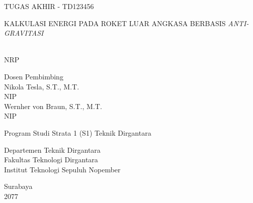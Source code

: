 \begin{large}
  TUGAS AKHIR - TD123456
\end{large}

\vspace{\fill}

\begin{spacing}{1.5}
  \begin{Large}
    KALKULASI ENERGI PADA ROKET LUAR
    ANGKASA BERBASIS \emph{ANTI-GRAVITASI}
  \end{Large}
\end{spacing}

\vspace{\fill}

\begin{large}
  \name{} \\
  \textmd{NRP \nrp{}}
\end{large}

\vspace{\fill}

\begin{large}
  \textmd{Dosen Pembimbing} \\
  Nikola Tesla, S.T., M.T. \\
  \textmd{NIP \advisornip{}} \\
  Wernher von Braun, S.T., M.T. \\
  \textmd{NIP \coadvisornip{}}
\end{large}

\vspace{\fill}

Program Studi Strata 1 (S1) Teknik Dirgantara \\

\mdseries

Departemen Teknik Dirgantara \\
Fakultas Teknologi Dirgantara \\
Institut Teknologi Sepuluh Nopember

Surabaya \\
2077
